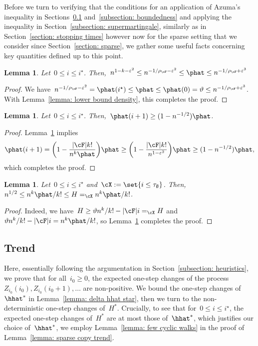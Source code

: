 \documentclass[11pt]{amsart}
\newcommand{\eps}{\varepsilon}
\DeclarePairedDelimiter{\paren}{\lparen}{\rparen}
\DeclarePairedDelimiter{\abs}{\lvert}{\rvert}
\newcommand{\Xeq}{=_{\cX}}
\renewcommand{\theta}{\vartheta}
\newtheorem{lemma}[algocf]{Lemma}
\theoremstyle{definition}
\numberwithin{equation}{section}
\begin{document}
	Before we turn to verifying that the conditions for an application of Azuma's inequality in Sections~\ref{subsection: trend} and~\ref{subsection: boundedness} and applying the inequality in Section~\ref{subsection: supermartingale}, similarly as in Section~\ref{section: stopping times} however now for the sparse setting that we consider since  Section~\ref{section: sparse}, we gather some useful facts concerning key quantities defined up to this point.
	
	\begin{lemma}\label{lemma: bounds for phat}
		Let~$0\leq i\leq i^\star$.
		Then,~$n^{1-k-\eps^2}\leq n^{-1/\rho_\cF-\eps^2}\leq\phat\leq n^{-1/\rho_\cF+\eps^3}$
	\end{lemma}
	\begin{proof}
		We have~$n^{-1/\rho_\cF-\eps^2}=\phat(i^\star)\leq \phat\leq \phat(0)=\theta\leq n^{-1/\rho_\cF+\eps^3}$.
		With Lemma~\ref{lemma: lower bound density}, this completes the proof.
	\end{proof}
	
	\begin{lemma}\label{lemma: bounds for delta phat}
		Let~$0\leq i\leq i^\star$.
		Then,~$\phat(i+1)\geq (1-n^{-1/2})\phat$.
	\end{lemma}
	\begin{proof}
		Lemma~\ref{lemma: bounds for phat} implies%
		\begin{equation*}
			\phat(i+1)
			=\paren[\bigg]{ 1-\frac{\abs{\cF}k!}{n^k\phat} }\phat
			\geq \paren[\bigg]{ 1-\frac{\abs{\cF}k!}{n^{1-\eps^2}} }\phat
			\geq (1-n^{-1/2})\phat,
		\end{equation*}
		which completes the proof.
	\end{proof}
	
	\begin{lemma}\label{lemma: sparse edges of H}
		Let~$0\leq i\leq i^\star$ and~$\cX:=\set{i\leq \tau_\emptyset}$.
		Then,~$n^{1/2}\leq n^k\phat/k!\leq H\Xeq n^k\phat/k!$.
	\end{lemma}
	\begin{proof}
		Indeed, we have~$H\geq \theta n^k/k!-\abs{\cF}i\Xeq H$ and~$\theta n^k/k!-\abs{\cF}i=n^k\phat/k!$, so Lemma~\ref{lemma: bounds for phat} completes the proof.
	\end{proof}
	
	\subsection{Trend}\label{subsection: trend}
	Here, essentially following the argumentation in Section~\ref{subsection: heuristics}, we prove that for all~$i_0\geq 0$, the expected one-step changes of the process~$Z_{i_0}(i_0),Z_{i_0}(i_0+1),\ldots$ are non-positive.
	We bound the one-step changes of~$\hhat^*$ in Lemma~\ref{lemma: delta hhat star}, then we turn to the non-deterministic one-step changes of~$H^*$.
	Crucially, to see that for~$0\leq i\leq i^\star$, the expected one-step changes of~$H^*$ are at most those of~$\hhat^*$, which justifies our choice of~$\hhat^*$, we employ Lemma~\ref{lemma: few cyclic walks} in the proof of Lemma~\ref{lemma: sparse copy trend}.
	
\end{document}
